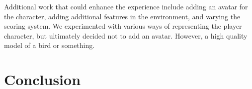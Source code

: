 \documentclass{article}
\begin{document}
Additional work that could enhance the experience include adding an avatar for the character, adding additional features in the environment, and varying the scoring system. We experimented with various ways of representing the player character, but ultimately decided not to add an avatar. However, a high quality model of a bird or something.


\section{Conclusion}
\end{document}
